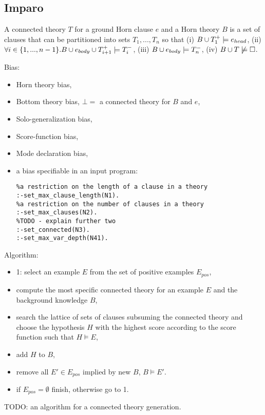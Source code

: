 \iffalse
\subsection{ProGolem}
\begin{itemize}
\item Inverse Entailment,
\item co-generalization, 
\end{itemize}
\fi

\subsection{Imparo\cite{kimber2009}}
\begin{defn}
A connected theory $T$ for a ground Horn clause $e$ and a Horn theory $B$ is a set of clauses that can be partitioned into sets $T_1, ..., T_n$ so that
(i) $B \cup T_1^+ \models e_{head}$,
(ii) $\forall i \in \{1, ..., n-1\}. B \cup e_{body} \cup T_{i+1}^+ \models T_i^-$,
(iii) $B \cup e_{body} \models T_n^-$,
(iv) $B \cup T \not\models \square$.

\end{defn}
Bias:
\begin{itemize}
\item Horn theory bias,
\item Bottom theory bias, $\bot=$ a connected theory for $B$ and $e$,
\item Solo-generalization bias,
\item Score-function bias,
\item Mode declaration bias,
\item a bias specifiable in an input program:
\begin{lstlisting}
%a restriction on the length of a clause in a theory
:-set_max_clause_length(N1).
%a restriction on the number of clauses in a theory
:-set_max_clauses(N2).
%TODO - explain further two
:-set_connected(N3).
:-set_max_var_depth(N41).
\end{lstlisting}
\end{itemize}
Algorithm:
\begin{itemize}
\item 1: select an example $E$ from the set of positive examples $E_{pos}$,
\item compute the most specific connected theory for an example $E$ and the background knowledge $B$,
\item search the lattice of sets of clauses subsuming the connected theory and choose the hypothesis $H$ with the highest score according to the score function such that $H \models E$,
\item add $H$ to $B$,
\item remove all $E' \in E_{pos}$ implied by new $B$, $B \models E'$.
\item if $E_{pos} = \emptyset$ finish, otherwise go to 1.
\end{itemize}
TODO: an algorithm for a connected theory generation.


